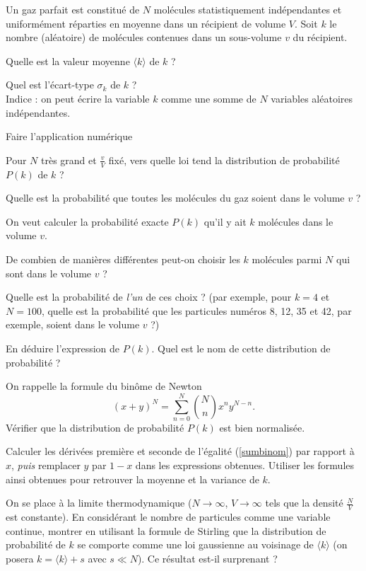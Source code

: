 Un gaz parfait est constitué de $N$ molécules statistiquement indépendantes et uniformément réparties en moyenne dans un récipient de volume $V$.  Soit $k$ le nombre (aléatoire) de molécules contenues dans un sous-volume $v$ du récipient.

\medskip

\question
Quelle est la valeur moyenne $\langle k \rangle$ de $k$ ?

\question
Quel est l'écart-type $\sigma_k$ de $k$ ? \\
Indice : on peut écrire la variable $k$ comme une somme de $N$ variables aléatoires indépendantes.
  

\question
Faire l'application numérique

\question
Pour $N$ très grand et $\frac{v}{V}$ fixé, vers quelle loi tend la distribution de probabilité $P(k)$ de $k$ ?

\question
Quelle est la probabilité que toutes les molécules du gaz soient dans le volume $v$ ?

On veut calculer la probabilité exacte $P(k)$ qu'il y ait $k$ molécules dans le volume $v$.

\question
De combien de manières différentes peut-on choisir les $k$ molécules parmi $N$ qui sont dans le volume $v$ ?

\question
Quelle est la probabilité de \emph{l'un} de ces choix ? (par exemple, pour $k=4$ et $N=100$, quelle est la probabilité que les particules numéros 8, 12, 35 et 42, par exemple, soient dans le volume $v$ ?)

\question
En déduire l'expression de $P(k)$. Quel est le nom de cette distribution de probabilité ?

\question
On rappelle la formule du binôme de Newton
\begin{equation} 
(x+y)^N=\sum_{n=0}^N \binom Nn x^n y^{N-n}.
\label{sumbinom}
\end{equation}
Vérifier que la distribution de probabilité $P(k)$ est bien normalisée.

\question
Calculer les dérivées première et seconde de l'égalité (\ref{sumbinom}) par rapport à $x$, \emph{puis} remplacer $y$ par $1-x$ dans les expressions obtenues. Utiliser les formules ainsi obtenues pour retrouver la moyenne et la variance de $k$.

\question
On se place à la limite thermodynamique ($N \to \infty$, $V \to \infty$ tels que la densité $\frac{N}{V}$ est constante). En considérant le nombre de particules comme une variable continue, montrer en utilisant la formule de Stirling que la distribution de probabilité de $k$ se comporte comme une loi gaussienne au voisinage de $\langle k \rangle$ (on posera $k = \langle k \rangle + s$ avec $s \ll N$). Ce résultat est-il surprenant ?
